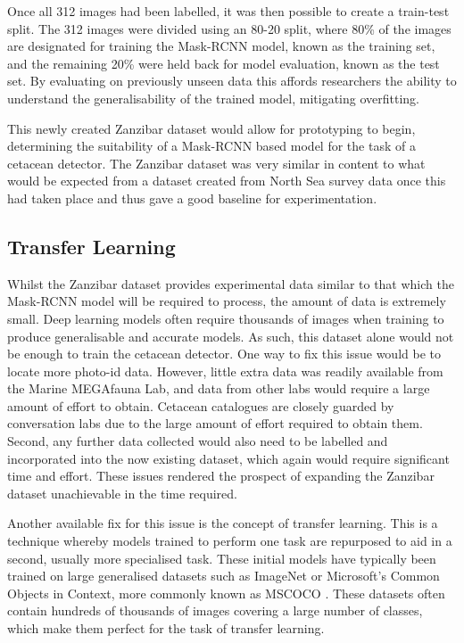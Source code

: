 Once all 312 images had been labelled, it was then possible to create a train-test split. The 312 images were divided using an 80-20 split, where 80\% of the images are designated for training the Mask-RCNN model, known as the training set, and the remaining 20\% were held back for model evaluation, known as the test set. By evaluating on previously unseen data this affords researchers the ability to understand the generalisability of the trained model, mitigating overfitting. 

This newly created Zanzibar dataset would allow for prototyping to begin, determining the suitability of a Mask-RCNN based model for the task of a cetacean detector. The Zanzibar dataset was very similar in content to what would be expected from a dataset created from North Sea survey data once this had taken place and thus gave a good baseline for experimentation. 

\subsection{Transfer Learning}\label{ch:cetDet,sec:initialTesting,sub:transferLearning}

Whilst the Zanzibar dataset provides experimental data similar to that which the Mask-RCNN model will be required to process, the amount of data is extremely small. Deep learning models often require thousands of images when training to produce generalisable and accurate models. As such, this dataset alone would not be enough to train the cetacean detector. One way to fix this issue would be to locate more photo-id data. However, little extra data was readily available from the Marine MEGAfauna Lab, and data from other labs would require a large amount of effort to obtain. Cetacean catalogues are closely guarded by conversation labs due to the large amount of effort required to obtain them. Second, any further data collected would also need to be labelled and incorporated into the now existing dataset, which again would require significant time and effort. These issues rendered the prospect of expanding the Zanzibar dataset unachievable in the time required. 

Another available fix for this issue is the concept of transfer learning. This is a technique whereby models trained to perform one task are repurposed to aid in a second, usually more specialised task. These initial models have typically been trained on large generalised datasets such as ImageNet \cite{deng_imagenet:_2009} or Microsoft's Common Objects in Context, more commonly known as MSCOCO \cite{lin_microsoft_2014}. These datasets often contain hundreds of thousands of images covering a large number of classes, which make them perfect for the task of transfer learning. 

